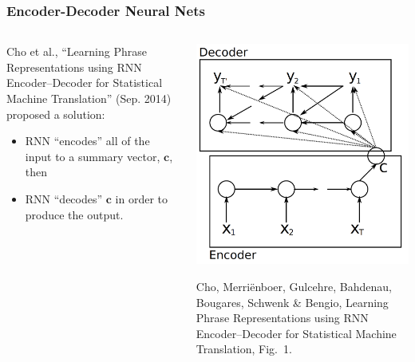 \documentclass{beamer}
\begin{document}
\begin{frame}
  \frametitle{Encoder-Decoder Neural Nets}
  \begin{columns}
    \begin{column}{0.5\textwidth}
      Cho et al., ``Learning Phrase Representations using RNN
      Encoder–Decoder for Statistical Machine Translation''
      (Sep. 2014) proposed a solution:
      \begin{itemize}
      \item RNN ``encodes'' all of the input to a summary vector, $\bm{c}$, then
      \item RNN ``decodes'' $\bm{c}$ in order to produce the output.
      \end{itemize}
    \end{column}
    \begin{column}{0.5\textwidth}
      \begin{center}
        \includegraphics[width=\textwidth]{figs/cho2014sep_fig1.png}

        \begin{tiny}
          Cho, Merri{\"{e}}nboer, Gulcehre, Bahdenau, Bougares,
          Schwenk \& Bengio, Learning Phrase Representations using RNN
          Encoder–Decoder for Statistical Machine Translation, Fig.~1.
        \end{tiny}
      \end{center}
    \end{column}
  \end{columns}
\end{frame}
  
\end{document}

